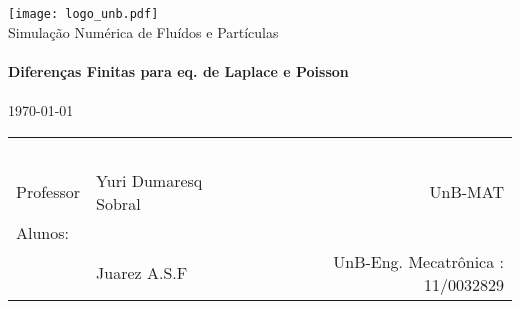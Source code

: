 \begin{titlepage}
\begin{center}

\texttt{[image: logo\_unb.pdf]}~\\[1cm]

\Huge Simulação Numérica de  Fluídos e Partículas\\[0.5cm]

\HRule \\[0.4cm]
{ \huge \bfseries  Diferenças Finitas para eq. de Laplace e Poisson}\\[0.4cm]

\HRule \\[0.5cm]

{\large \today}


\vfill %



	\begin{center} \large
		\begin{tabular}{llr} \
		& & \\[0.05cm]		
		Professor & Yuri Dumaresq Sobral & UnB-MAT\\
		
		Alunos:& & \\
		& Juarez A.S.F 					& UnB-Eng. Mecatrônica : 11/0032829\\	
		\end{tabular}

	
	\end{center}


\end{center}
\end{titlepage}